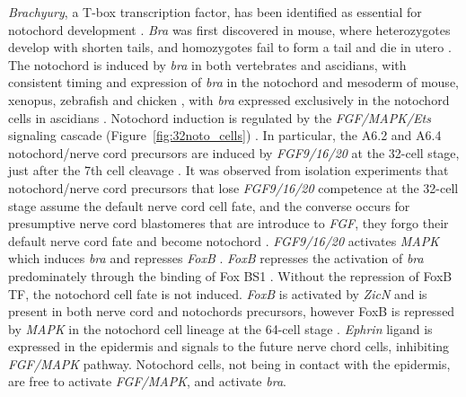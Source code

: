\textit{Brachyury}, a T-box transcription factor, has been identified as essential for notochord development \cite{yasuo_conservation_1998}. \textit{Bra} was first discovered in mouse, where heterozygotes develop with shorten tails, and homozygotes fail to form a tail and die in utero \cite{herrmann_t_1994}. The notochord is induced by {\em bra} in both vertebrates and ascidians, with consistent timing and expression of \textit{bra} in the notochord and mesoderm of mouse, xenopus, zebrafish and chicken \cite{kavka_tales_1997}, with {\em bra} expressed exclusively in the notochord cells in ascidians \cite{yasuo_ascidian_1994}. Notochord induction is regulated by the \textit{FGF/MAPK/Ets} signaling cascade (Figure~\ref{fig:32noto_cells}) \cite{minokawa_binary_2001}. In particular, the A6.2 and A6.4 notochord/nerve cord precursors are induced by \textit{FGF9/16/20} at the 32-cell stage, just after the 7th cell cleavage \cite{satoh_ascidian_2001}. It was observed from isolation experiments that notochord/nerve cord precursors that lose \textit{FGF9/16/20} competence at the 32-cell stage assume the default nerve cord cell fate, and the converse occurs for presumptive nerve cord blastomeres that are introduce to \textit{FGF}, they forgo their default nerve cord fate and become notochord \cite{yasuo_conservation_1998,minokawa_binary_2001}. %
\textit{FGF9/16/20} activates \textit{MAPK} which induces \textit{bra} and represses \textit{FoxB} \cite{hashimoto_transcription_2011}. %
\textit{FoxB} represses the activation of \textit{bra} predominately through the binding of Fox BS1%
. Without the repression of FoxB TF, the notochord cell fate is not induced. %
\textit{FoxB} is activated by \textit{ZicN} and is present in both nerve cord and notochords precursors, however FoxB is repressed by \textit{MAPK} in the notochord cell lineage at the 64-cell stage \cite{hashimoto_transcription_2011}. \textit{Ephrin} ligand is expressed in the epidermis and signals to the future nerve chord cells, inhibiting \textit{FGF/MAPK} pathway. Notochord cells, not being in contact with the epidermis, are free to activate \textit{FGF/MAPK}, and activate \textit{bra}.

